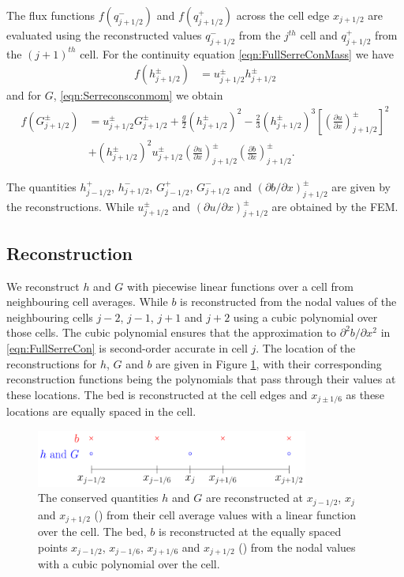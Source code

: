 \documentclass[times]{elsarticle}
\DeclareRobustCommand{\circlet}[1]{\tikz{\draw[#1,thick] (0,0) circle [radius=0.1cm];}}
\DeclareRobustCommand{\crosst}[1]{\tikz{\draw[#1,thick] (0cm,0cm) --
  		(0.1cm,0.1cm) -- (0cm,0.2cm) -- (0.1cm,0.1cm) -- (0.2cm,0.2cm) -- (0.1cm,0.1cm)-- (0.2cm,0cm);}}
\begin{document}
The flux functions $f(q^-_{j+1/2})$ and $f(q^+_{j+1/2})$ across the cell edge $x_{j+1/2}$ are evaluated using the reconstructed values $q^-_{j+1/2}$ from the $j^{th}$ cell and $q^+_{j+1/2}$ from the $(j+1)^{th}$ cell. For the continuity equation \eqref{eqn:FullSerreConMass} we have
\begin{align}
f\left(h^\pm_{j+1/2}\right) &= u^\pm_{j + 1/2}  {h}^\pm_{j + 1/2}
\label{eqn:FluxMassNum}
\end{align}
and for $G$, \eqref{eqn:Serreconsconmom} we obtain
\begin{align}
f\left(G^\pm_{j+1/2}\right) &=  u^\pm_{j + 1/2} G^\pm_{j + 1/2}  + \frac{g}{2}\left({h}^\pm_{j + 1/2} \right)^2 - \frac{2}{3}\left({h}^\pm_{j + 1/2}\right)^3 \left[\left(\frac{\partial {u}}{\partial x} \right)^\pm_{j + 1/2} \right]^2 \nonumber\\ &+ \left({h}^\pm_{j + 1/2}\right)^2 u^\pm_{j + 1/2} \left(\frac{\partial {u}}{\partial x} \right)^\pm_{j + 1/2} \left(\frac{\partial b}{\partial x} \right)^\pm_{j + 1/2} .
\label{eqn:FluxIrrotNum}
\end{align}

The quantities ${h}^+_{j - 1/2}$, ${h}^-_{j + 1/2}$, $G^+_{j - 1/2}$, $G^-_{j + 1/2}$ and $ \left({\partial {b}}/{\partial x} \right)^\pm_{j + 1/2}$ are given by the reconstructions. While $u^\pm_{j+1/2}$ and $ \left({\partial {u}}/{\partial x} \right)^\pm_{j + 1/2}$ are obtained by the FEM.

\subsection{Reconstruction}
We reconstruct $h$ and $G$ with piecewise linear functions over a cell from neighbouring cell averages. While $b$ is reconstructed from the nodal values of the neighbouring cells $j-2$, $j-1$, $j+1$ and $j+2$ using a cubic polynomial over those cells. The cubic polynomial ensures that the approximation to $\partial^2 b / \partial x^2$ in \eqref{eqn:FullSerreCon} is second-order accurate in cell $j$. The location of the reconstructions for $h$, $G$ and $b$ are given in Figure \ref{fig:ReconLocs}, with their corresponding reconstruction functions being the polynomials that pass through their values at these locations. The bed is reconstructed at the cell edges and $x_{j\pm1/6}$ as these locations are equally spaced in the cell.

\begin{figure}
	\centering
	\includegraphics[width=0.8\textwidth]{./Figures/Diagrams/FEMbasis/Reconstruction/FEVMRecon.pdf}
	\caption{The conserved quantities $h$ and $G$ are reconstructed at $x_{j-1/2}$, $x_j$ and $x_{j+1/2}$ (\circlet{blue}) from their cell average values with a linear function over the cell. The bed, $b$ is reconstructed at the equally spaced points $x_{j-1/2}$, $x_{j-1/6}$, $x_{j+1/6}$ and $x_{j+1/2}$ (\crosst{red}) from the nodal values with a cubic polynomial over the cell.}
	\label{fig:ReconLocs}
\end{figure} 
\end{document}
